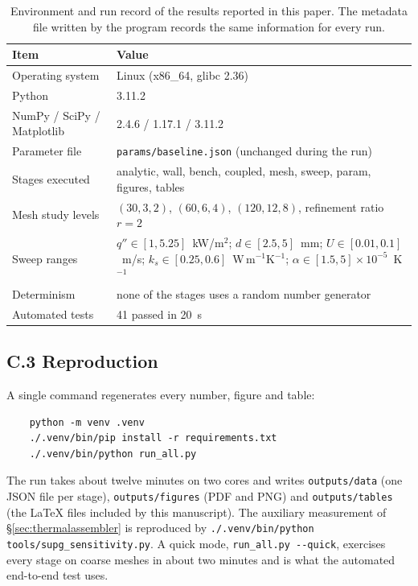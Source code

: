 \documentclass[11pt,a4paper]{article}
\begin{document}
\begin{table}[htbp]
\centering
\caption{Environment and run record of the results reported in this paper.
The metadata file written by the program records the same information for
every run.}
\label{tab:environment}
\small
\begin{tabular}{@{}ll@{}}
\toprule
Item & Value\\
\midrule
Operating system & Linux (x86\_64, glibc 2.36)\\
Python & 3.11.2\\
NumPy / SciPy / Matplotlib & 2.4.6 / 1.17.1 / 3.11.2\\
Parameter file & \texttt{params/baseline.json} (unchanged during the run)\\
Stages executed & analytic, wall, bench, coupled, mesh, sweep, param, figures, tables\\
Mesh study levels & $(30,3,2)$, $(60,6,4)$, $(120,12,8)$, refinement ratio $r=2$\\
Sweep ranges & $q''\in[1,5.25]$~kW/m$^2$; $d\in[2.5,5]$~mm; $U\in[0.01,0.1]$~m/s; $k_s\in[0.25,0.6]$~W\,m$^{-1}$K$^{-1}$; $\alpha\in[1.5,5]\times10^{-5}$~K$^{-1}$\\
Determinism & none of the stages uses a random number generator\\
Automated tests & 41 passed in 20~s\\
\bottomrule
\end{tabular}
\end{table}

\subsection*{C.3 Reproduction}

A single command regenerates every number, figure and table:
\begin{verbatim}
    python -m venv .venv
    ./.venv/bin/pip install -r requirements.txt
    ./.venv/bin/python run_all.py
\end{verbatim}
The run takes about twelve minutes on two cores and writes
\texttt{outputs/data} (one JSON file per stage), \texttt{outputs/figures}
(PDF and PNG) and \texttt{outputs/tables} (the \LaTeX{} files included by this
manuscript). The auxiliary measurement of \S\ref{sec:thermalassembler} is
reproduced by \texttt{./.venv/bin/python tools/supg\_sensitivity.py}. A quick
mode, \texttt{run\_all.py -{}-quick}, exercises every stage on coarse meshes in
about two minutes and is what the automated end-to-end test uses.
\end{document}
